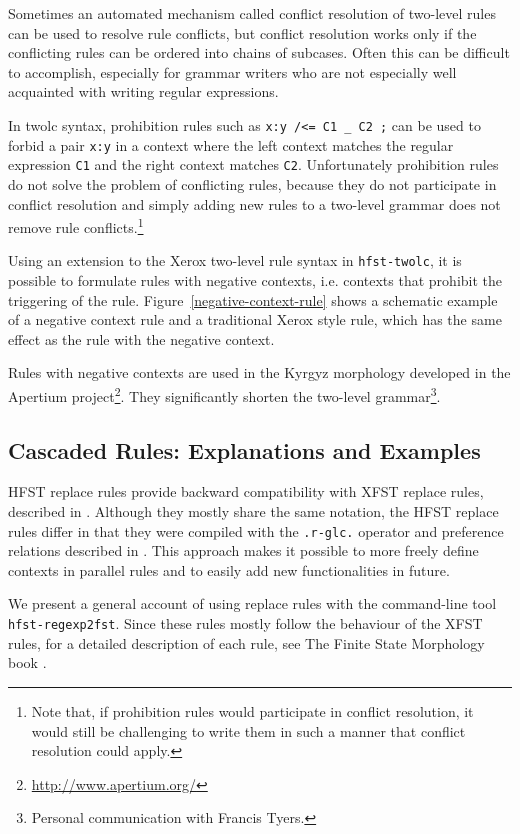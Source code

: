\documentclass{llncs}
\begin{document}
Sometimes an automated mechanism called conflict resolution of
two-level rules~\cite{silfverberg/2009/2} can be used to resolve rule
conflicts, but conflict resolution works only if the conflicting rules
can be ordered into chains of subcases. Often this can be difficult
to accomplish, especially for grammar writers who are not especially
well acquainted with writing regular expressions.

In twolc syntax, prohibition rules such as {\tt x:y /<= C1 \_ C2 ;}
can be used to forbid a pair {\tt x:y} in a context where the left
context matches the regular expression {\tt C1} and the right context
matches {\tt C2}. Unfortunately prohibition rules do not solve the
problem of conflicting rules, because they do not participate in conflict
resolution and simply adding new rules to a two-level grammar does not
remove rule conflicts.\footnote{Note that, if prohibition rules would
  participate in conflict resolution, it would still be challenging to
  write them in such a manner that conflict resolution could apply.}

Using an extension to the Xerox two-level rule syntax in
\verb|hfst-twolc|, it is possible to formulate rules with negative
contexts, i.e. contexts that prohibit the triggering of the
rule. Figure~\ref{negative-context-rule} shows a schematic example of
a negative context rule and a traditional Xerox style rule, which has
the same effect as the rule with the negative context.

Rules with negative contexts are used in the Kyrgyz morphology
developed in the Apertium project\footnote{\url{http://www.apertium.org/}}.
They significantly shorten the two-level
grammar\footnote{Personal communication with Francis Tyers.}.


\subsection{Cascaded Rules: Explanations and Examples}

HFST replace rules provide backward compatibility with XFST replace rules, 
described in \cite{Kempe96parallelreplacement,beesley/2003}. 
Although they mostly share the same notation, the HFST replace rules differ in that
they were compiled with the \verb!.r-glc.! operator \cite{Gerdemann/1999} and preference
relations described in \cite{ylijyra/2008b}. This approach makes it possible to more freely
define contexts in parallel rules and to easily add new functionalities in future.

We present a general account of using replace rules with the command-line tool {\tt hfst-regexp2fst}. Since these rules mostly follow the behaviour of the XFST rules,
for a detailed description of each rule, see The Finite State Morphology book \cite{beesley/2003}.
\end{document}
